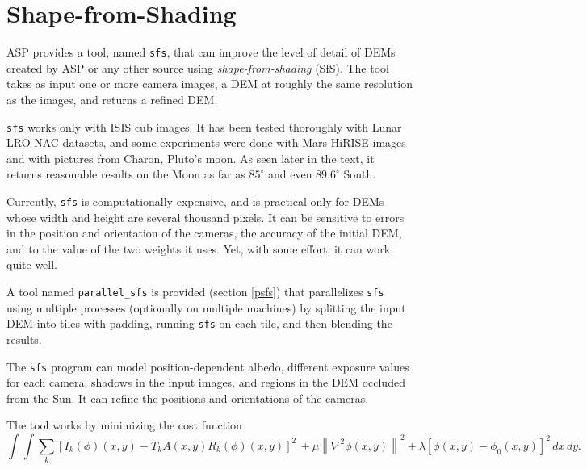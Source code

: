
\chapter{Shape-from-Shading}
\label{ch:sfs}

ASP provides a tool, named \texttt{sfs}, that can improve the level of
detail of DEMs created by ASP or any other source using
\textit{shape-from-shading} (SfS). The tool takes as input one or more
camera images, a DEM at roughly the same resolution as the images, and
returns a refined DEM.

\texttt{sfs} works only with ISIS cub images. It has been tested
thoroughly with Lunar LRO NAC datasets, and some experiments were done
with Mars HiRISE images and with pictures from Charon, Pluto's moon. As
seen later in the text, it returns reasonable results on the Moon as far
as $85^\circ$ and even $89.6^\circ$ South.

Currently, \texttt{sfs} is computationally expensive, and is practical
only for DEMs whose width and height are several thousand pixels. It can be 
sensitive to errors in the position and orientation of the cameras, the
accuracy of the initial DEM, and to the value of the two weights it uses.
Yet, with some effort, it can work quite well. 

A tool named \texttt{parallel\_sfs} is provided (section \ref{psfs}) 
that parallelizes \texttt{sfs} using multiple processes (optionally on
multiple machines) by splitting the input DEM into tiles with padding,
running \texttt{sfs} on each tile, and then blending the results. 

The \texttt{sfs} program can model position-dependent albedo, different
exposure values for each camera, shadows in the input images, and regions
in the DEM occluded from the Sun. It can refine the positions and orientations
of the cameras.

The tool works by minimizing the cost function
\begin{equation}\label{cost}
  \int\!\! \int \! \sum_k \left[ I_k(\phi)(x, y) - T_k A(x, y)
    R_k(\phi)(x, y) \right]^2\,  
  + \mu \left\|\nabla^2 \phi(x, y) \right\|^2  
  + \lambda  \left[ \phi(x, y) - \phi_0(x, y) \right]^2
  \, dx\, dy.
\end{equation}

